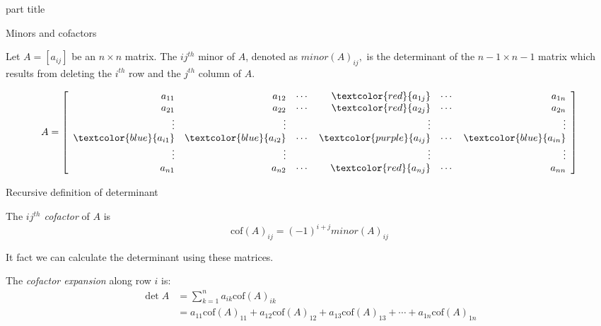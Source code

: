 \documentclass{beamer}
\begin{document}
\begin{frame}
  \begin{beamercolorbox}[sep=12pt,center]{part title}
    \insertsection\par
  \end{beamercolorbox}
\end{frame}

\begin{frame}{Minors and cofactors}
  \begin{definition}
    Let $A = \left[a_{ij} \right]$ be an $n \times n$ matrix. 
    The \alert{$ij^{th}$ minor} of $A$, denoted as
    $minor\left( A\right) _{ij},$ is the determinant
    of the $n-1 \times n-1$ matrix which results from deleting the $i^{th}$ row and
    the $j^{th}$ column of $A$.
  \end{definition}

  \[
    A=
    \left[
      \begin{array}{rrrrrr}
        a_{11} & a_{12} & \cdots & \textcolor{red}{a_{1j}} & \cdots & a_{1n} \\
        a_{21} & a_{22} & \cdots & \textcolor{red}{a_{2j}} & \cdots & a_{2n} \\
        \vdots & \vdots & & \vdots & & \vdots \\
        \textcolor{blue}{a_{i1}} & \textcolor{blue}{a_{i2}} & \cdots & \textcolor{purple}{a_{ij}} & \cdots & \textcolor{blue}{a_{in}} \\
        \vdots & \vdots & & \vdots & & \vdots \\
        a_{n1} & a_{n2} & \cdots & \textcolor{red}{a_{nj}} & \cdots & a_{nn}
      \end{array}
    \right] 
  \]
\end{frame}

\begin{frame}{Recursive definition of determinant}
  \begin{definition}
    The \emph{$ij^{th}$ cofactor} of $A$ is
    \begin{equation*}
      \mbox{cof}(A)_{ij}=(-1)^{i+j} minor \left(A\right)_{ij}
    \end{equation*}
  \end{definition}
  It fact we can calculate the determinant using these matrices.
  \begin{definition}
    The \emph{cofactor expansion} along row $i$ is:
    \begin{align*}
      \det A &= \sum_{k=1}^n a_{ik}\mbox{cof}(A)_{ik}\\
             &=a_{11} \mbox{cof}(A)_{11} + a_{12}\mbox{cof}(A)_{12} +
      a_{13}\mbox{cof}(A)_{13} + \cdots + a_{1n}\mbox{cof}(A)_{1n}
    \end{align*}
  \end{definition}
\end{frame}
\end{document}
